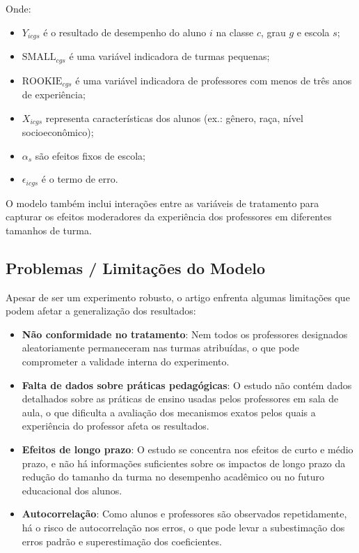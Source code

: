 \documentclass[a4paper,12pt]{article}[abntex2]
\begin{document}
Onde:
\begin{itemize}
    \item \( Y_{icgs} \) é o resultado de desempenho do aluno \(i\) na classe \(c\), grau \(g\) e escola \(s\);
    \item \( \text{SMALL}_{cgs} \) é uma variável indicadora de turmas pequenas;
    \item \( \text{ROOKIE}_{cgs} \) é uma variável indicadora de professores com menos de três anos de experiência;
    \item \( X_{icgs} \) representa características dos alunos (ex.: gênero, raça, nível socioeconômico);
    \item \( \alpha_s \) são efeitos fixos de escola;
    \item \( \epsilon_{icgs} \) é o termo de erro.
\end{itemize}

O modelo também inclui interações entre as variáveis de tratamento para capturar os efeitos moderadores da experiência dos professores em diferentes tamanhos de turma.

\subsection{\textbf{Problemas / Limitações do Modelo}}

Apesar de ser um experimento robusto, o artigo enfrenta algumas limitações que podem afetar a generalização dos resultados:

\begin{itemize}
    \item \textbf{Não conformidade no tratamento}: Nem todos os professores designados aleatoriamente permaneceram nas turmas atribuídas, o que pode comprometer a validade interna do experimento.
    \item \textbf{Falta de dados sobre práticas pedagógicas}: O estudo não contém dados detalhados sobre as práticas de ensino usadas pelos professores em sala de aula, o que dificulta a avaliação dos mecanismos exatos pelos quais a experiência do professor afeta os resultados.
    \item \textbf{Efeitos de longo prazo}: O estudo se concentra nos efeitos de curto e médio prazo, e não há informações suficientes sobre os impactos de longo prazo da redução do tamanho da turma no desempenho acadêmico ou no futuro educacional dos alunos.
    \item \textbf{Autocorrelação}: Como alunos e professores são observados repetidamente, há o risco de autocorrelação nos erros, o que pode levar a subestimação dos erros padrão e superestimação dos coeficientes.
\end{itemize}
\end{document}
